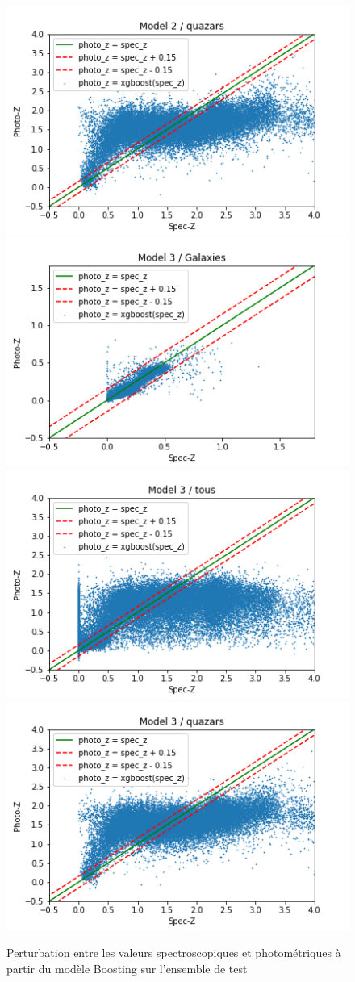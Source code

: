 \begin{figure}[H]
	\includegraphics[scale = 0.4]{images/model2_quazars.png}
	\includegraphics[scale = 0.4]{images/model3_galaxies.png}
	\includegraphics[scale = 0.4]{images/model3_tous.png}
	\includegraphics[scale = 0.4]{images/model3_quazars.png}
	\caption{Perturbation entre les valeurs spectroscopiques et photométriques à partir du modèle Boosting sur l'ensemble de test}
\end{figure}
